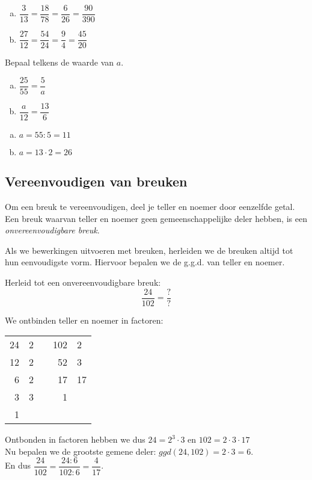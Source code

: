 \documentclass[12pt]{article}
\begin{document}
\begin{solution}
\begin{enumerate}[(a)]
  \item $\dfrac{3}{13}=\dfrac{18}{78}=\dfrac{6}{26}=\dfrac{90}{390}$
  \item $\dfrac{27}{12}=\dfrac{54}{24}=\dfrac{9}{4}=\dfrac{45}{20}$
\end{enumerate}
\end{solution}

\begin{exercise}
Bepaal telkens de waarde van $a$.
\begin{enumerate}[(a)]
  \item $\dfrac{25}{55}=\dfrac{5}{a}$
  \item $\dfrac{a}{12}=\dfrac{13}{6}$
\end{enumerate}
\end{exercise}

\begin{solution}
\begin{enumerate}[(a)]
  \item $a=55:5=11$
  \item $a=13\cdot 2=26$
\end{enumerate}
\end{solution}

\subsection{Vereenvoudigen van breuken}

Om een breuk te vereenvoudigen, deel je teller en noemer door eenzelfde getal.
Een breuk waarvan teller en noemer geen gemeenschappelijke deler hebben, is een {\em onvereenvoudigbare breuk}. 

Als we bewerkingen uitvoeren met breuken, herleiden we de breuken altijd tot hun eenvoudigste vorm.
Hiervoor bepalen we de g.g.d. van teller en noemer.

\begin{voorbeeld}
Herleid tot een onvereenvoudigbare breuk:
$$\dfrac{24}{102}=\dfrac{?}{?}$$

We ontbinden teller en noemer in factoren:
\begin{center}
\begin{tabular}{r|lp{2cm}r|l}
24 & 2 & & 102 & 2\\
12 & 2 & &  52 & 3\\
6 & 2  & &  17 & 17\\
3 & 3  & &   1\\
1
\end{tabular}
\end{center}
Ontbonden in factoren hebben we dus $24=2^3\cdot 3$ en $102=2\cdot 3 \cdot 17$\\

Nu bepalen we de grootste gemene deler: $ggd(24,102)=2\cdot 3=6$.\\

En dus $\dfrac{24}{102}=\dfrac{24:6}{102:6}=\dfrac{4}{17}$.

\end{voorbeeld}
\end{document}
